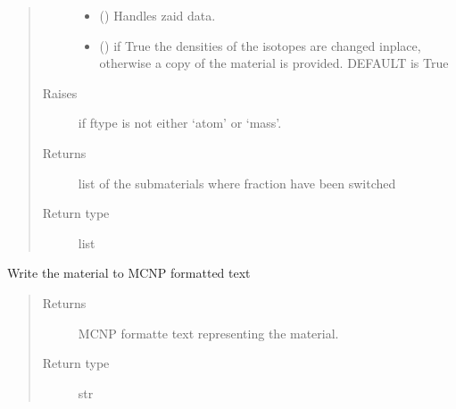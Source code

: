 \documentclass[letterpaper,10pt,english]{sphinxmanual}
\begin{document}
\begin{fulllineitems}
\begin{fulllineitems}
\begin{quote}
\begin{description}
\begin{itemize}
\item {} 
 ({\hyperref[\detokenize{api/initobjects:libmanager.LibManager}]{}}) \textendash{} Handles zaid data.

\item {} 
 () \textendash{} if True the densities of the isotopes are changed inplace,
otherwise a copy of the material is provided. DEFAULT is True

\end{itemize}

\item[{Raises}] \leavevmode
{} \textendash{} if ftype is not either ‘atom’ or ‘mass’.

\item[{Returns}] \leavevmode
{} \textendash{} list of the submaterials where fraction have been switched

\item[{Return type}] \leavevmode
list

\end{description}\end{quote}

\end{fulllineitems}


\begin{fulllineitems}
\label{\detokenize{api/inputgeneration:matreader.Material.to_text}}
Write the material to MCNP formatted text
\begin{quote}\begin{description}
\item[{Returns}] \leavevmode
MCNP formatte text representing the material.

\item[{Return type}] \leavevmode
str

\end{description}\end{quote}

\end{fulllineitems}



\end{fulllineitems}
\end{document}
